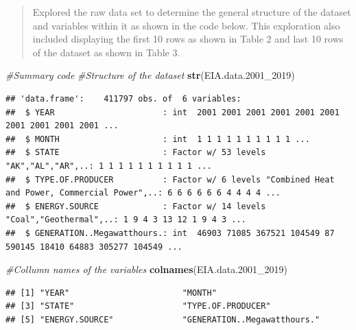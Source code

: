 \documentclass[12pt,]{article}
\newenvironment{Shaded}{\begin{snugshade}}{\end{snugshade}}
\newcommand{\KeywordTok}[1]{\textcolor[rgb]{0.13,0.29,0.53}{\textbf{#1}}}
\newcommand{\DataTypeTok}[1]{\textcolor[rgb]{0.13,0.29,0.53}{#1}}
\newcommand{\DecValTok}[1]{\textcolor[rgb]{0.00,0.00,0.81}{#1}}
\newcommand{\StringTok}[1]{\textcolor[rgb]{0.31,0.60,0.02}{#1}}
\newcommand{\CommentTok}[1]{\textcolor[rgb]{0.56,0.35,0.01}{\textit{#1}}}
\newcommand{\OperatorTok}[1]{\textcolor[rgb]{0.81,0.36,0.00}{\textbf{#1}}}
\newcommand{\NormalTok}[1]{#1}
\begin{document}
\begin{quote}
Explored the raw data set to determine the general structure of the
dataset and variables within it as shown in the code below. This
exploration also included displaying the first 10 rows as shown in Table
2 and last 10 rows of the dataset as shown in Table 3.
\end{quote}

\begin{Shaded}
\begin{Highlighting}[]
\CommentTok{#Summary code}
\CommentTok{#Structure of the dataset}
\KeywordTok{str}\NormalTok{(EIA.data.2001_}\DecValTok{2019}\NormalTok{)}
\end{Highlighting}
\end{Shaded}

\begin{verbatim}
## 'data.frame':    411797 obs. of  6 variables:
##  $ YEAR                      : int  2001 2001 2001 2001 2001 2001 2001 2001 2001 2001 ...
##  $ MONTH                     : int  1 1 1 1 1 1 1 1 1 1 ...
##  $ STATE                     : Factor w/ 53 levels "AK","AL","AR",..: 1 1 1 1 1 1 1 1 1 1 ...
##  $ TYPE.OF.PRODUCER          : Factor w/ 6 levels "Combined Heat and Power, Commercial Power",..: 6 6 6 6 6 6 4 4 4 4 ...
##  $ ENERGY.SOURCE             : Factor w/ 14 levels "Coal","Geothermal",..: 1 9 4 3 13 12 1 9 4 3 ...
##  $ GENERATION..Megawatthours.: int  46903 71085 367521 104549 87 590145 18410 64883 305277 104549 ...
\end{verbatim}

\begin{Shaded}
\begin{Highlighting}[]
\CommentTok{#Collumn names of the variables}
\KeywordTok{colnames}\NormalTok{(EIA.data.2001_}\DecValTok{2019}\NormalTok{)}
\end{Highlighting}
\end{Shaded}

\begin{verbatim}
## [1] "YEAR"                       "MONTH"                     
## [3] "STATE"                      "TYPE.OF.PRODUCER"          
## [5] "ENERGY.SOURCE"              "GENERATION..Megawatthours."
\end{verbatim}

\begin{Shaded}
\end{Shaded}
\end{document}
